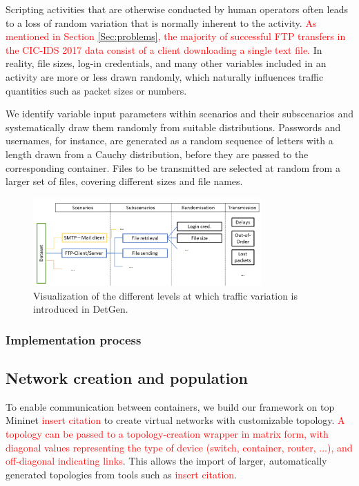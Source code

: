 \documentclass{article}
\begin{document}
Scripting activities that are otherwise conducted by human operators often leads to a loss of random variation that is normally inherent to the activity.
\textcolor{red}{As mentioned in Section \ref{Sec:problems}, the majority of successful FTP transfers in the CIC-IDS 2017 data consist of a client downloading a single text file.} In reality, file sizes, log-in credentials, and many other variables included in an activity are more or less drawn randomly, which naturally influences traffic quantities such as packet sizes or numbers.

We identify variable input parameters within scenarios and their subscenarios and systematically draw them randomly from suitable distributions. Passwords and usernames, for instance, are generated as a random sequence of letters with a length drawn from a Cauchy distribution, before they are passed to the corresponding container. Files to be transmitted are selected at random from a larger set of files, covering different sizes and file names.

\begin{figure}
 \centering 
 \includegraphics[width=0.780\textwidth]{images/scenario_branching.PNG}
 \caption{Visualization of the different levels at which traffic variation is introduced in DetGen.}
 \label{Fig:branching}
\end{figure}

\subsubsection*{Implementation process}

\subsection{Network creation and population}


To enable communication between containers, we build our framework on top Mininet \textcolor{red}{insert citation} to create virtual networks with customizable topology. 
\textcolor{red}{A topology can be passed to a topology-creation wrapper in matrix form, with diagonal values representing the type of device (switch, container, router, ...), and off-diagonal indicating links}. This allows the import of larger, automatically generated topologies from tools such as \textcolor{red}{insert citation}. 
\end{document}
